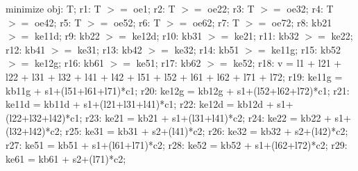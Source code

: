 \documentclass[a4paper,11pt, titlepage]{article}
\begin{document}
\begin{flushleft}
minimize obj: T;\linebreak
\linebreak
r1: T $>=$ oe1;\linebreak
r2: T $>=$ oe22;\linebreak
r3: T $>=$ oe32;\linebreak
r4: T $>=$ oe42;\linebreak
r5: T $>=$ oe52;\linebreak
r6: T $>=$ oe62;\linebreak
r7: T $>=$ oe72;\linebreak
\linebreak
r8: kb21 $>=$ ke11d;\linebreak
r9: kb22 $>=$ ke12d;\linebreak
r10: kb31 $>=$ ke21;\linebreak
r11: kb32 $>=$ ke22;\linebreak
r12: kb41 $>=$ ke31;\linebreak
r13: kb42 $>=$ ke32;\linebreak
r14: kb51 $>=$ ke11g;\linebreak
r15: kb52 $>=$ ke12g;\linebreak
r16: kb61 $>=$ ke51;\linebreak
r17: kb62 $>=$ ke52;\linebreak
\linebreak
r18: v = l1 + l21 + l22 + l31 + l32 + l41 + l42 + l51 + l52 + l61 + l62 + l71 + l72;\linebreak
\linebreak
r19: ke11g = kb11g + s1+(l51+l61+l71)*c1;\linebreak
r20: ke12g = kb12g + s1+(l52+l62+l72)*c1;\linebreak
r21: ke11d = kb11d + s1+(l21+l31+l41)*c1;\linebreak
r22: ke12d = kb12d + s1+(l22+l32+l42)*c1;\linebreak
r23: ke21 = kb21 + s1+(l31+l41)*c2;\linebreak
r24: ke22 = kb22 + s1+(l32+l42)*c2;\linebreak
r25: ke31 = kb31 + s2+(l41)*c2;\linebreak
r26: ke32 = kb32 + s2+(l42)*c2;\linebreak
r27: ke51 = kb51 + s1+(l61+l71)*c2;\linebreak
r28: ke52 = kb52 + s1+(l62+l72)*c2;\linebreak
r29: ke61 = kb61 + s2+(l71)*c2;\linebreak

\end{flushleft}
\end{document}
